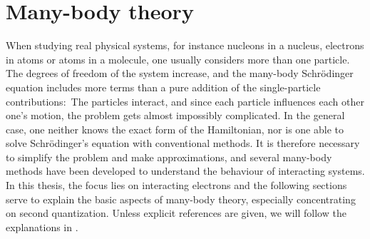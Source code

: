 \chapter{Many-body theory}
\label{chap:mb}

When studying real physical systems, for instance nucleons in a nucleus, electrons in atoms or atoms in a molecule, one usually considers more than one particle. The degrees of freedom of the system increase, and the many-body Schr\"odinger equation includes more terms than a pure addition of the single-particle contributions:\
The particles interact, and since each particle influences each other one's motion, the problem gets almost impossibly complicated. In the general case, one neither knows the exact form of the Hamiltonian, nor is one able to solve Schr\"odinger's equation with conventional methods. It is therefore necessary to simplify the problem and make approximations, and several many-body methods have been developed to understand the behaviour of interacting systems.\\
In this thesis, the focus lies on interacting electrons and the following sections serve to explain the basic aspects of many-body theory, especially concentrating on second quantization. Unless explicit references are given, we will follow the explanations in \cite{shavitt2009many,nolting2009grundkurs}.
 
 
